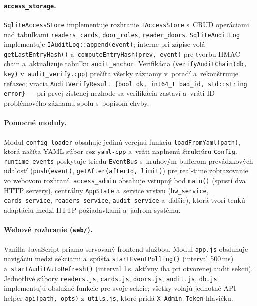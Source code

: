 \documentclass[a4paper]{feidipsp}
\begin{document}
\paragraph{\texttt{access\_storage}.}
\texttt{SqliteAccessStore} implementuje rozhranie \texttt{IAccessStore} s~CRUD operáciami nad tabuľkami \texttt{readers}, \texttt{cards}, \texttt{door\_roles}, \texttt{reader\_doors}. \texttt{SqliteAuditLog} implementuje \texttt{IAuditLog::append(event)}; interne pri zápise volá \texttt{getLastEntryHash()} a~\texttt{computeEntryHash(prev, event)} pre tvorbu HMAC chain a~aktualizuje tabuľku \texttt{audit\_anchor}. Verifikácia (\texttt{verifyAuditChain(db, key)} v~\texttt{audit\_verify.cpp}) prečíta všetky záznamy v~poradí a~rekonštruuje reťazec; vracia \texttt{AuditVerifyResult \{bool ok, int64\_t bad\_id, std::string error\}} --- pri prvej zistenej nezhode sa verifikácia zastaví a~vráti ID problémového záznamu spolu s~popisom chyby.

\paragraph{Pomocné moduly.}
Modul \texttt{config\_loader} obsahuje jedinú verejnú funkciu \texttt{loadFromYaml(path)}, ktorá načíta YAML súbor cez \texttt{yaml-cpp} a~vráti naplnenú štruktúru \texttt{Config}. \texttt{runtime\_events} poskytuje triedu \texttt{EventBus} s~kruhovým bufferom prevádzkových udalostí (\texttt{push(event)}, \texttt{getAfter(afterId, limit)}) pre real-time zobrazovanie vo webovom rozhraní. \texttt{access\_admin} obsahuje vstupný bod \texttt{main()} (spustí dva HTTP servery), centrálny \texttt{AppState} a~service vrstvu (\texttt{hw\_service}, \texttt{cards\_service}, \texttt{readers\_service}, \texttt{audit\_service} a~ďalšie), ktorá tvorí tenkú adaptáciu medzi HTTP požiadavkami a~jadrom systému.

\paragraph{Webové rozhranie (\texttt{web/}).}
Vanilla JavaScript priamo servovaný frontend službou. Modul \texttt{app.js} obsluhuje navigáciu medzi sekciami a~spúšťa \texttt{startEventPolling()} (interval 500\,ms) a~\texttt{startAuditAutoRefresh()} (interval 1\,s, aktívny iba pri otvorenej audit sekcii). Jednotlivé súbory \texttt{readers.js}, \texttt{cards.js}, \texttt{doors.js}, \texttt{audit.js}, \texttt{db.js} implementujú obslužné funkcie pre svoje sekcie; všetky volajú jednotné API helper \texttt{api(path, opts)} z~\texttt{utils.js}, ktoré pridá \texttt{X-Admin-Token} hlavičku.
\end{document}
